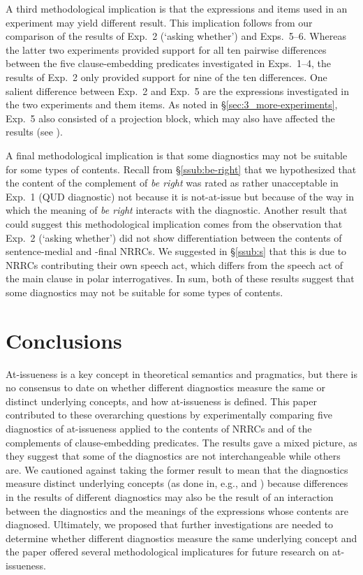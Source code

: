 \documentclass[times,linguex]{glossa}
\begin{document}
A third methodological implication is that the expressions and items used in an experiment may yield different result. This implication follows from our comparison of the results of Exp.~2 (`asking whether') and Exps.~5--6. Whereas the latter two experiments provided support for all ten pairwise differences between the five clause-embedding predicates investigated in Exps.~1--4, the results of Exp.~2 only provided support for nine of the ten differences. One salient difference between Exp.~2 and Exp.~5 are the expressions investigated in the two experiments and them items. As noted in \S\ref{sec:3_more-experiments}, Exp.~5 also consisted of a projection block, which may also have affected the results (see \citealt{degen_projection_2025}).

A final methodological implication is that some diagnostics may not be suitable for some types of contents. Recall from \S\ref{ssub:be-right} that we hypothesized that the content of the complement of \emph{be right} was rated as rather unacceptable in Exp.~1 (QUD diagnostic) not because it is not-at-issue but because of the way in which the meaning of \emph{be right} interacts with the diagnostic. Another result that could suggest this methodological implication comes from the observation that Exp.~2 (`asking whether') did not show differentiation between the contents of sentence-medial and -final NRRCs. We suggested in \S\ref{ssub:s} that this is due to NRRCs contributing their own speech act, which differs from the speech act of the main clause in polar interrogatives. In sum, both of these results suggest that some diagnostics may not be suitable for some types of contents.

\section{Conclusions \label{sec:5_conclusion}}

At-issueness is a key concept in theoretical semantics and pragmatics, but there is no consensus to date on whether different diagnostics measure the same or distinct underlying concepts, and how at-issueness is defined. This paper contributed to these overarching questions by experimentally comparing five diagnostics of at-issueness applied to the contents of NRRCs and of the complements of clause-embedding predicates. The results gave a mixed picture, as they suggest that some of the diagnostics are not interchangeable while others are. We cautioned against taking the former result to mean that the diagnostics measure distinct underlying concepts (as done in, e.g., \citealt{snider_anaphoric_2017} and \citealt{koev_notions_2018}) because differences in the results of different diagnostics may also be the result of an interaction between the diagnostics and the meanings of the expressions whose contents are diagnosed. Ultimately, we proposed that further investigations are needed to determine whether different diagnostics measure the same underlying concept and the paper offered several methodological implicatures for future research on at-issueness.
\end{document}
